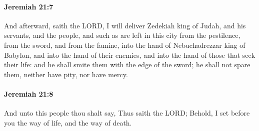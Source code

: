 		\paragraph{Jeremiah 21:7} %
			\label{JEREMIAH-21-7}

			And afterward, saith the LORD, I will deliver Zedekiah king of Judah, and his servants, and the people, and such as are left in this city from the pestilence, from the sword, and from the famine, into the hand of Nebuchadrezzar king of Babylon, and into the hand of their enemies, and into the hand of those that seek their life: and he shall smite them with the edge of the sword; he shall not spare them, neither have pity, nor have mercy.


		\paragraph{Jeremiah 21:8} %
			\label{JEREMIAH-21-8}

			And unto this people thou shalt say, Thus saith the LORD; Behold, I set before you the way of life, and the way of death.

